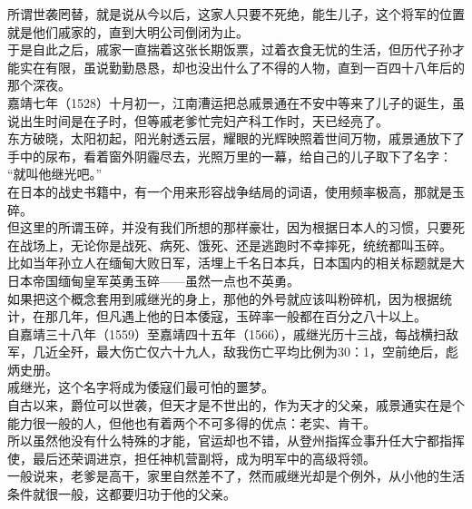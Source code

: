 \begin{multicols}{\theparacolNo}
所谓世袭罔替，就是说从今以后，这家人只要不死绝，能生儿子，这个将军的位置就是他们戚家的，直到大明公司倒闭为止。\\

于是自此之后，戚家一直揣着这张长期饭票，过着衣食无忧的生活，但历代子孙才能实在有限，虽说勤勤恳恳，却也没出什么了不得的人物，直到一百四十八年后的那个深夜。\\

嘉靖七年（1528）十月初一，江南漕运把总戚景通在不安中等来了儿子的诞生，虽说出生时间是在子时，但等戚老爹忙完妇产科工作时，天已经亮了。\\

东方破晓，太阳初起，阳光射透云层，耀眼的光辉映照着世间万物，戚景通放下了手中的尿布，看着窗外阴霾尽去，光照万里的一幕，给自己的儿子取下了名字：\\

“就叫他继光吧。”\\

在日本的战史书籍中，有一个用来形容战争结局的词语，使用频率极高，那就是玉碎。\\

但这里的所谓玉碎，并没有我们所想的那样豪壮，因为根据日本人的习惯，只要死在战场上，无论你是战死、病死、饿死、还是逃跑时不幸摔死，统统都叫玉碎。\\

比如当年孙立人在缅甸大败日军，活埋上千名日本兵，日本国内的相关标题就是大日本帝国缅甸皇军英勇玉碎——虽然一点也不英勇。\\

如果把这个概念套用到戚继光的身上，那他的外号就应该叫粉碎机，因为根据统计，在那几年，但凡遇上他的日本倭寇，玉碎率一般都在百分之八十以上。\\

自嘉靖三十八年（1559）至嘉靖四十五年（1566），戚继光历十三战，每战横扫敌军，几近全歼，最大伤亡仅六十九人，敌我伤亡平均比例为30：1，空前绝后，彪炳史册。\\

戚继光，这个名字将成为倭寇们最可怕的噩梦。\\

自古以来，爵位可以世袭，但天才是不世出的，作为天才的父亲，戚景通实在是个能力很一般的人，但他也有着两个不可多得的优点：老实、肯干。\\

所以虽然他没有什么特殊的才能，官运却也不错，从登州指挥佥事升任大宁都指挥使，最后还荣调进京，担任神机营副将，成为明军中的高级将领。\\

一般说来，老爹是高干，家里自然差不了，然而戚继光却是个例外，从小他的生活条件就很一般，这都要归功于他的父亲。\\


\end{multicols}

